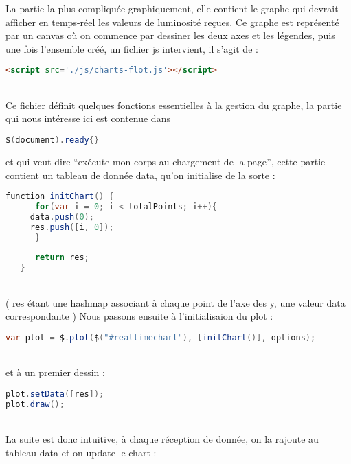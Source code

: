 La partie la plus compliquée graphiquement, elle contient le graphe qui devrait afficher en temps-réel les valeurs de luminosité reçues. Ce graphe est représenté par un canvas où on commence par dessiner les deux axes et les légendes, puis une fois l’ensemble créé, un fichier js intervient, il s’agit de :\\
\begin{DDbox}{\linewidth}
\begin{lstlisting}[language=html]
<script src='./js/charts-flot.js'></script>
\end{lstlisting}
\end{DDbox}
\\
Ce fichier définit quelques fonctions essentielles à la gestion du graphe, la partie qui nous intéresse ici est contenue dans
\begin{lstlisting}[language=java]
  $(document).ready{}
  \end{lstlisting}
et qui veut dire ``exécute mon corps au chargement de la page'', cette partie contient un tableau de donnée data, qu’on initialise de la sorte :\\
\begin{DDbox}{\linewidth}
  \begin{lstlisting}[language=java]
  function initChart() {
      for(var i = 0; i < totalPoints; i++){
	 data.push(0);
	 res.push([i, 0]);
      }
      
      return res;
   }
\end{lstlisting}
\end{DDbox}
\\
( res étant une hashmap associant à chaque point de l’axe des y, une valeur data correspondante )
Nous passons ensuite à l’initialisaion du plot :\\
\begin{DDbox}{\linewidth}
\begin{lstlisting}[language=java]
  var plot = $.plot($("#realtimechart"), [initChart()], options);
\end{lstlisting}
\end{DDbox}
\\
et à un premier dessin :\\
\begin{DDbox}{\linewidth}
\begin{lstlisting}[language=java]
  plot.setData([res]);
plot.draw();
\end{lstlisting}
\end{DDbox}
\\
La suite est donc intuitive, à chaque réception de donnée, on la rajoute au tableau data et on update le chart :\\
